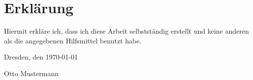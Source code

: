  

\section*{\vfill{} \thispagestyle{empty}
Erklärung}

Hiermit erkläre ich, dass ich diese Arbeit selbstständig erstellt
und keine anderen als die angegebenen Hilfsmittel benutzt habe.
\bigskip{}

\noindent Dresden, den \today %
\vspace{2.5cm}

\noindent Otto Mustermann \cleardoublepage{}
